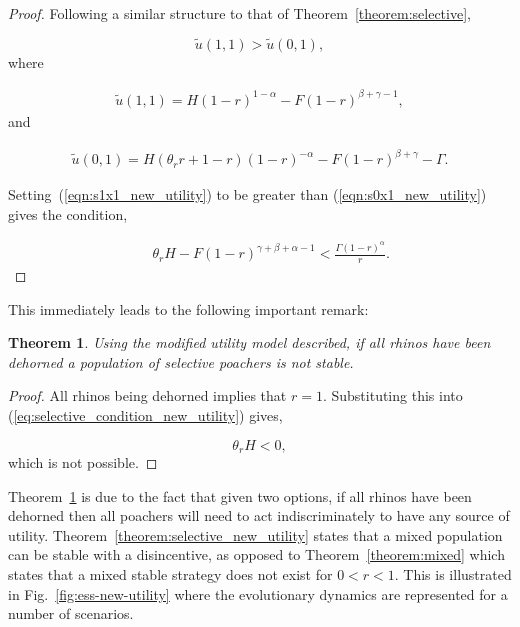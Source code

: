 \documentclass[10pt]{article}
\newtheorem{theorem}{Theorem}
\begin{document}
\begin{proof}
    Following a similar structure to that of Theorem~\ref{theorem:selective},

    \begin{equation}
    \tilde{u}(1,1) > \tilde{u}(0,1),
    \end{equation}
    where
    
    \begin{eqnarray}
    \label{eqn:s1x1_new_utility}
    \tilde{u}(1,1) = H(1 - r)^{1 - \alpha} - F(1 - r)^{\beta + \gamma - 1},
    \end{eqnarray}
    and 
    
    \begin{eqnarray}
    \label{eqn:s0x1_new_utility}
    \tilde{u}(0,1) = H(\theta_r r +1 - r)(1 - r)^{-\alpha} - F(1 - r)^{\beta + \gamma} - \Gamma.
    \end{eqnarray}

    \noindent Setting~(\ref{eqn:s1x1_new_utility}) to be greater than (\ref{eqn:s0x1_new_utility})
    gives the condition,

    \begin{eqnarray}
    \label{eqn:s1x1_s0x1_new_utility}
    &&\theta_r H -  F(1 -r) ^{\gamma + \beta + \alpha -1} < \frac{\Gamma (1- r) ^ {\alpha}}{r}.
    \end{eqnarray} 
\end{proof}

\noindent This immediately leads to the following important remark:

\begin{theorem}\label{theorem:devaluating_rhinos}
Using the modified utility model described,
if all rhinos have been dehorned a population of selective poachers is not
stable.
\end{theorem}

\begin{proof}
All rhinos being dehorned implies that \(r=1\). Substituting this into
(\ref{eq:selective_condition_new_utility}) gives,

\begin{equation}
    \theta_r H < 0,
\end{equation}
which is not possible.
\end{proof}

Theorem~\ref{theorem:devaluating_rhinos} is due to the fact that given two
options, if all rhinos have been dehorned then all poachers will need to act
indiscriminately to have any source of utility. Theorem~\ref{theorem:selective_new_utility}
states that a  mixed population can be stable with a disincentive, as opposed to
Theorem~\ref{theorem:mixed} which states that a mixed stable strategy does not
exist for \(0 <r <1\). This is illustrated in Fig.~\ref{fig:ess-new-utility} where
the evolutionary dynamics are represented for a number of scenarios.
\end{document}
